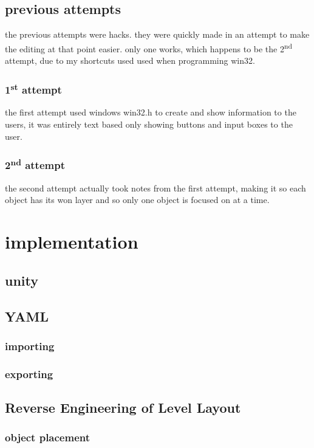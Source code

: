\subsection{previous attempts}
the previous attempts were hacks. they were quickly made in an attempt to make the editing at that point easier. only one works, which happens to be the 2\textsuperscript{nd} attempt, due to my shortcuts used used when programming win32.
\subsubsection{1\textsuperscript{st} attempt}
the first attempt used windows win32.h to create and show information to the users, it was entirely text based only showing buttons and input boxes to the user.
\subsubsection{2\textsuperscript{nd} attempt}
the second attempt actually took notes from the first attempt, making it so each object has its won layer and so only one object is focused on at a time. 

\section{implementation}
\subsection{unity}

\subsection{YAML}
\subsubsection{importing}
\subsubsection{exporting}

\subsection{Reverse Engineering of Level Layout}
\subsubsection{object placement}
